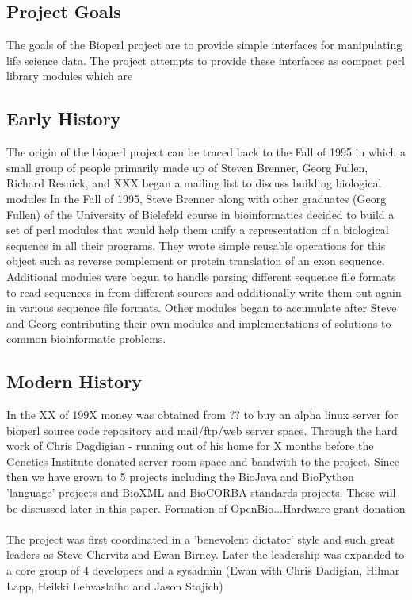 \documentclass{article}
\begin{document}
\begin{twocolumn}
\section{Project Goals} 

The goals of the Bioperl project are to provide simple interfaces for
manipulating life science data.  The project attempts to provide these
interfaces as compact perl library modules which are  

\subsection{Early History}

The origin of the bioperl project can be traced back to the Fall of
1995 in which a small group of people primarily made up of Steven
Brenner, Georg Fullen, Richard Resnick, and XXX began a mailing list
\cite{oldbioperlmaillist} to discuss building biological modules 
In the Fall of 1995, Steve Brenner along with other graduates (Georg
Fullen) of the University of Bielefeld course in bioinformatics
decided to build a set of perl modules that would help them unify a
representation of a biological sequence in all their programs.  They
wrote simple reusable operations for this object such as reverse
complement or protein translation of an exon sequence.  Additional
modules were begun to handle parsing different sequence file formats
to read sequences in from different sources and additionally write
them out again in various sequence file formats.  Other modules began
to accumulate after Steve and Georg contributing their own modules and
implementations of solutions to common bioinformatic problems.

\subsection{Modern History}
In the XX of 199X money was obtained from ?? to buy an alpha linux
server for bioperl source code repository and mail/ftp/web server space.
Through the hard work of Chris Dagdigian - running out of his home for
X months before the Genetics Institute donated server room space and
bandwith to the project.  Since then we have grown to 5 projects
including the BioJava and BioPython 'language' projects and BioXML and
BioCORBA standards projects.  These will be discussed later in this
paper.  
Formation of OpenBio...Hardware grant donation\\
\\ %
The project was first coordinated in a 'benevolent dictator' style and
such great leaders as Steve Chervitz and Ewan Birney.  Later the
leadership was expanded to a core group of 4 developers and a sysadmin
(Ewan with Chris Dadigian, Hilmar Lapp, Heikki Lehvaslaiho and Jason
Stajich)



\end{twocolumn}
\end{document}
